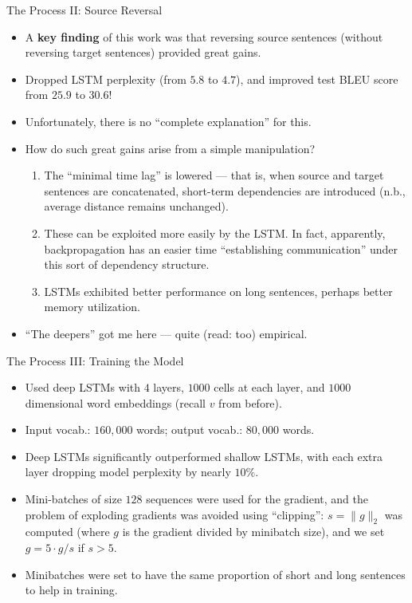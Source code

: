 \documentclass{beamer}
\begin{document}
\begin{frame}{The Process II: Source Reversal}

\begin{itemize}
  \itemsep10pt
  \item A \textbf{key finding} of this work was that reversing source sentences
    (without reversing target sentences) provided great gains.
  \item Dropped LSTM perplexity (from $5.8$ to $4.7$), and improved test BLEU
    score from $25.9$ to $30.6$!
  \item Unfortunately, there is no ``complete explanation'' for this. 🤔
  \item How do such great gains arise from a simple manipulation?
    \begin{enumerate}
      \item The ``minimal time lag'' is lowered --- that is, when source and
        target sentences are concatenated, short-term dependencies are
        introduced (n.b., average distance remains unchanged).
      \item These can be exploited more easily by the LSTM. In fact, apparently,
        backpropagation has an easier time ``establishing communication'' under
        this sort of dependency structure.
      \item LSTMs exhibited better performance on long sentences, perhaps better
        memory utilization.
    \end{enumerate}
  \item ``The deepers'' got me here --- quite (read: too) empirical.
\end{itemize}

\end{frame}


\begin{frame}{The Process III: Training the Model}

\begin{itemize}
  \itemsep10pt
  \item Used deep LSTMs with $4$ layers, $1000$ cells at each layer, and $1000$
    dimensional word embeddings (recall $v$ from before).
  \item Input vocab.: $160,000$ words; output vocab.: $80,000$ words.
  \item Deep LSTMs significantly outperformed shallow LSTMs, with each extra
    layer dropping model perplexity by nearly $10\%$.
  \item Mini-batches of size $128$ sequences were used for the gradient, and the
    problem of exploding gradients was avoided using ``clipping'':
    $s = \lVert g \rVert_{2}$ was computed (where $g$ is the gradient divided by
    minibatch size), and we set $g = 5 \cdot g / s$ if $s > 5$.
  \item Minibatches were set to have the same proportion of short and long
    sentences to help in training.
\end{itemize}

\end{frame}
\end{document}
